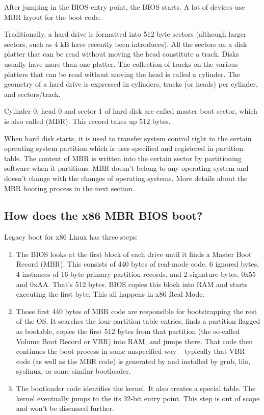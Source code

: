 \documentclass[a4paper]{article}
\begin{document}
After jumping in the BIOS entry point, the BIOS starts. A lot of devices use MBR layout for the boot code.

Traditionally, a hard drive is formatted into 512 byte sectors (although larger sectors, such as 4 kB have recently been introduces). All the sectors on a disk platter that can be read without moving the head constitute a track. Disks usually have more than one platter. The collection of tracks on the various platters that can be read without moving the head is called a cylinder. The geometry of a hard drive is expressed in cylinders, tracks (or heads) per cylinder, and sectors/track.

\begin{definition}
	Cylinder 0, head 0 and sector 1 of hard disk are called master boot sector, which is also called  (MBR). This record takes up 512 bytes.
\end{definition}
When hard disk starts, it is used to transfer system control right to the certain operating system partition which is user-specified and registered in partition table. The content of MBR is written into the certain sector by partitioning software when it partitions. MBR doesn't belong to any operating system and doesn't change with the changes of operating systems. More details about the MBR booting process in the next section.


\subsection{How does the x86 MBR BIOS boot?}
Legacy boot for x86 Linux has three steps:
\begin{enumerate}
\item The BIOS looks at the first block of each drive until it finds a Master Boot Record (MBR). This consists of 440 bytes of real-mode code, 6 ignored bytes, 4 instances of 16-byte primary partition records, and 2 signature bytes, 0x55 and 0xAA. That's 512 bytes. BIOS copies this block into RAM and starts executing the first byte. This all happens in x86 Real Mode.
\item Those first 440 bytes of MBR code are responsible for bootstrapping the rest of the OS. It searches the four partition table entries, finds a partition flagged as bootable, copies the first 512 bytes  from that partition (the so-called Volume Boot Record or VBR) into RAM, and jumps there. That code then continues the boot process in some unspecified way -- typically that VBR code (as well as the MBR code) is generated by and installed by grub, lilo, syslinux, or some similar bootloader.
\item The bootloader code identifies the kernel. It also creates a special table. The kernel eventually jumps to the its 32-bit entry point. This step is out of scope and won't be discussed further.
\end{enumerate}
\end{document}
